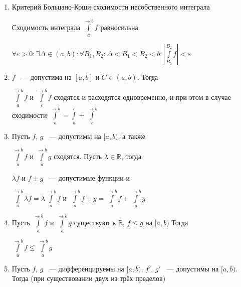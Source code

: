 \documentclass{article}
\begin{document}
            \begin{enumerate}
            
                \item Критерий Больцано-Коши сходимости несобственного интеграла
                
                    Сходимость интеграла $\int\limits^{\rightarrow b}_a f$ равносильна 
                    
                    $\forall \varepsilon > 0 : \exists \Delta \in (a, b) : \forall B_1, B_2 : \Delta < B_1 < B_2 < b : \left| \int\limits^{B_2}_{B_1} f \right| < \varepsilon$
                    
                \item $f$ ~--- допустима на $[a, b]$ и $C \in (a, b)$. Тогда
                
                    $\int\limits^{\rightarrow b}_a f$ и $\int\limits^{\rightarrow b}_c f$ сходятся и расходятся одновременно, и при этом в случае сходимости $\int\limits^{\rightarrow b}_a = \int\limits^c_a + \int\limits^{\rightarrow b}_c$
                    
                \item Пусть $f$, $g$ ~--- допустимы на $[a, b)$, а также
                
                    $\int\limits^{\rightarrow b}_a f$ и $\int\limits^{\rightarrow b}_a g$ сходятся. Пусть $\lambda \in \mathbb{R}$, тогда
                    
                    $\lambda f$ и $f \pm g$ ~--- допустимые функции и
                    
                    $\int\limits^{\rightarrow b}_a \lambda f = \lambda \int\limits^{\rightarrow b}_a f$ и $\int\limits^{\rightarrow b}_a f \pm g = \int\limits^{\rightarrow b}_a f \pm \int\limits^{\rightarrow b}_a g$
                    
                \item Пусть $\int\limits^{\rightarrow b}_a f$ и $\int\limits^{\rightarrow b}_a g$ существуют в $\overline{\mathbb{R}}$, $f \leq g$ на $[a, b)$ Тогда
                
                    $\int\limits^{\rightarrow b}_a f \leq \int\limits^{\rightarrow b}_a g$
                    
                \item Пусть $f$, $g$ ~--- дифференцируемы на $[a, b)$, $f'$, $g'$ ~--- допустимы на $[a, b)$. Тогда (при существовании двух из трёх пределов)
                

\end{enumerate}
\end{document}
